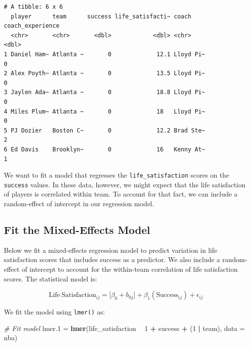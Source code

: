 \documentclass[]{book}
\newenvironment{Shaded}{\begin{snugshade}}{\end{snugshade}}
\newcommand{\CommentTok}[1]{\textcolor[rgb]{0.56,0.35,0.01}{\textit{#1}}}
\newcommand{\DataTypeTok}[1]{\textcolor[rgb]{0.13,0.29,0.53}{#1}}
\newcommand{\DecValTok}[1]{\textcolor[rgb]{0.00,0.00,0.81}{#1}}
\newcommand{\FloatTok}[1]{\textcolor[rgb]{0.00,0.00,0.81}{#1}}
\newcommand{\KeywordTok}[1]{\textcolor[rgb]{0.13,0.29,0.53}{\textbf{#1}}}
\newcommand{\NormalTok}[1]{#1}
\newcommand{\OperatorTok}[1]{\textcolor[rgb]{0.81,0.36,0.00}{\textbf{#1}}}
\newcommand{\StringTok}[1]{\textcolor[rgb]{0.31,0.60,0.02}{#1}}
\begin{document}
\begin{verbatim}
# A tibble: 6 x 6
  player      team      success life_satisfacti~ coach     coach_experience
  <chr>       <chr>       <dbl>            <dbl> <chr>                <dbl>
1 Daniel Ham~ Atlanta ~       0             12.1 Lloyd Pi~                0
2 Alex Poyth~ Atlanta ~       0             13.5 Lloyd Pi~                0
3 Jaylen Ada~ Atlanta ~       0             18.8 Lloyd Pi~                0
4 Miles Plum~ Atlanta ~       0             18   Lloyd Pi~                0
5 PJ Dozier   Boston C~       0             12.2 Brad Ste~                2
6 Ed Davis    Brooklyn~       0             16   Kenny At~                1
\end{verbatim}

We want to fit a model that regresses the \texttt{life\_satisfaction} scores on the \texttt{success} values. In these data, however, we might expect that the life satisfaction of players is correlated within team. To account for that fact, we can include a random-effect of intercept in our regression model.

\hypertarget{fit-the-mixed-effects-model}{%
\subsection{Fit the Mixed-Effects Model}\label{fit-the-mixed-effects-model}}

Below we fit a mixed-effects regression model to predict variation in life satisfaction scores that includes success as a predictor. We also include a random-effect of intercept to account for the within-team correlation of life satisfaction scores. The statistical model is:

\[
\mathrm{Life~Satisfaction}_{ij} = \bigg[\beta_0 + b_{0j} \bigg] + \beta_1(\mathrm{Success}_{ij}) + \epsilon_{ij}
\]

We fit the model using \texttt{lmer()} as:

\begin{Shaded}
\begin{Highlighting}[]
\CommentTok{# Fit model}
\NormalTok{lmer}\FloatTok{.1}\NormalTok{ =}\StringTok{ }\KeywordTok{lmer}\NormalTok{(life_satisfaction }\OperatorTok{~}\StringTok{ }\DecValTok{1} \OperatorTok{+}\StringTok{ }\NormalTok{success }\OperatorTok{+}\StringTok{ }\NormalTok{(}\DecValTok{1} \OperatorTok{|}\StringTok{ }\NormalTok{team), }\DataTypeTok{data =}\NormalTok{ nba)}
\end{Highlighting}
\end{Shaded}
\end{document}
